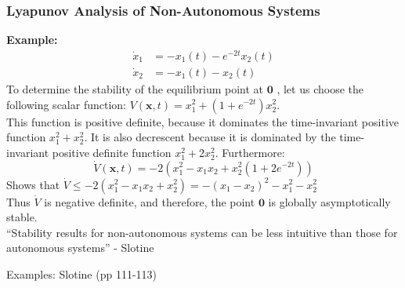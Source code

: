 \documentclass[11pt,handout]{beamer}   %
\begin{document}
\begin{frame}
\frametitle{Lyapunov Analysis of Non-Autonomous Systems}
\small
\textbf{Example:}
\begin{equation*}
\begin{aligned}
\dot{x}_1 &= -x_1(t) - e^{-2t} x_2(t)\\
\dot{x}_2 &= -x_1(t) - x_2(t)
\end{aligned}
\end{equation*}
To determine the stability of the equilibrium point at $\mathbf{0}$ , let us choose the following scalar function: $V(\mathbf{x},t) = x_1^2 + (1+e^{-2 t} )x_2^2$. \\
\vspace{6pt}
This function is positive definite, because it dominates the time-invariant positive function $x_1^2 + x_2^2$. It is also decrescent because it is dominated by the time-invariant positive definite function $x_1^2 + 2x_2^2$. Furthermore:
\begin{equation*}
\dot{V}(\mathbf{x},t) = -2(x_1^2 - x_1 x_2 + x_2^2(1+2 e^{-2t}))
\end{equation*}
Shows that 
$\dot{V} \leq -2(x_1^2 - x_1 x_2 +x_2^2) = -(x_1 - x_2)^2 - x_1^2 - x_2^2$\\
\vspace{6pt}
Thus $\dot{V}$ is negative definite, and therefore, the point $\mathbf{0}$ is globally asymptotically stable.\\
\vspace{6pt}
\large
``Stability results for non-autonomous systems can be less intuitive than those for autonomous systems'' - Slotine\\
\begin{tiny}
Examples: Slotine (pp 111-113)
\end{tiny}
\end{frame}
\end{document}
